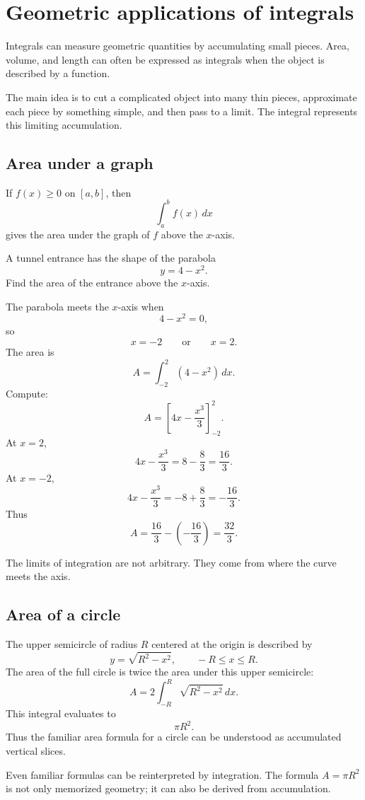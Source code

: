 \section{Geometric applications of integrals}

Integrals can measure geometric quantities by accumulating small pieces. Area, volume, and length can often be expressed as integrals when the object is described by a function.

The main idea is to cut a complicated object into many thin pieces, approximate each piece by something simple, and then pass to a limit. The integral represents this limiting accumulation.

\subsection*{Area under a graph}

If \(f(x)\ge0\) on \([a,b]\), then
\[
\int_a^b f(x)\,dx
\]
gives the area under the graph of \(f\) above the \(x\)-axis.

\begin{examplebox}
A tunnel entrance has the shape of the parabola
\[
y=4-x^2.
\]
Find the area of the entrance above the \(x\)-axis.

The parabola meets the \(x\)-axis when
\[
4-x^2=0,
\]
so
\[
x=-2
\qquad\text{or}\qquad
x=2.
\]
The area is
\[
A=\int_{-2}^{2}(4-x^2)\,dx.
\]
Compute:
\[
A=\left[4x-\frac{x^3}{3}\right]_{-2}^{2}.
\]
At \(x=2\),
\[
4x-\frac{x^3}{3}=8-\frac83=\frac{16}{3}.
\]
At \(x=-2\),
\[
4x-\frac{x^3}{3}=-8+\frac83=-\frac{16}{3}.
\]
Thus
\[
A=\frac{16}{3}-\left(-\frac{16}{3}\right)=\frac{32}{3}.
\]
\end{examplebox}

The limits of integration are not arbitrary. They come from where the curve meets the axis.

\subsection*{Area of a circle}

The upper semicircle of radius \(R\) centered at the origin is described by
\[
y=\sqrt{R^2-x^2},
\qquad -R\le x\le R.
\]
The area of the full circle is twice the area under this upper semicircle:
\[
A=2\int_{-R}^{R}\sqrt{R^2-x^2}\,dx.
\]
This integral evaluates to
\[
\pi R^2.
\]
Thus the familiar area formula for a circle can be understood as accumulated vertical slices.

\begin{remarkbox}
Even familiar formulas can be reinterpreted by integration. The formula \(A=\pi R^2\) is not only memorized geometry; it can also be derived from accumulation.
\end{remarkbox}

